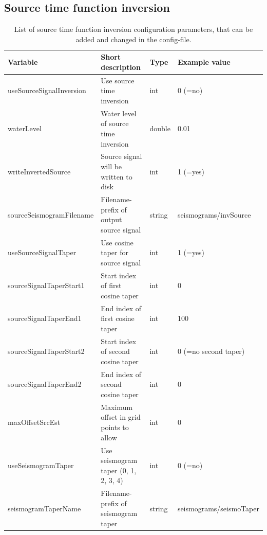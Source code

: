 \documentclass[pdftex,a4paper,parskip,listof=totoc,bibliography=totoc,onehalfspacing,12pt]{scrreprt}
\begin{document}
\subsection{Source time function inversion}
\begin{table}[h!]
\caption[List of source time function inversion configuration parameters.]{List of source time function inversion configuration parameters, that can be added and changed in the config-file.}\label{tab:config_sourcetime}
\centering
\begin{adjustbox}{width=1\textwidth,center=\textwidth}
	\begin{tabular}{llll}
	\toprule
         Variable                 & Short description                                                   & Type   & Example value \\
	\midrule
         useSourceSignalInversion & Use source time inversion                                           &  int   & 0 (=no) \\
         waterLevel               & Water level of source time inversion                                & double & 0.01 \\
         writeInvertedSource      & Source signal will be written to disk                               &  int   & 1 (=yes) \\
         sourceSeismogramFilename & Filename-prefix of output source signal                               & string & seismograms/invSource \\
         useSourceSignalTaper     & Use cosine taper for source signal                                  &  int   & 1 (=yes) \\
         sourceSignalTaperStart1  & Start index of first cosine taper                                   &  int   & 0 \\
         sourceSignalTaperEnd1    & End index of first cosine taper                                     &  int   & 100 \\
         sourceSignalTaperStart2  & Start index of second cosine taper                                  &  int   & 0 (=no second taper) \\
         sourceSignalTaperEnd2    & End index of second cosine taper                                    &  int   & 0 \\
         maxOffsetSrcEst          & Maximum offset in grid points to allow                              &  int   & 0 \\
         useSeismogramTaper       & Use seismogram taper (0, 1, 2, 3, 4)               &  int   & 0 (=no) \\
         seismogramTaperName      & Filename-prefix of seismogram taper                                   & string & seismograms/seismoTaper \\
	\bottomrule
	\end{tabular}
	\end{adjustbox}
\end{table}
\end{document}
